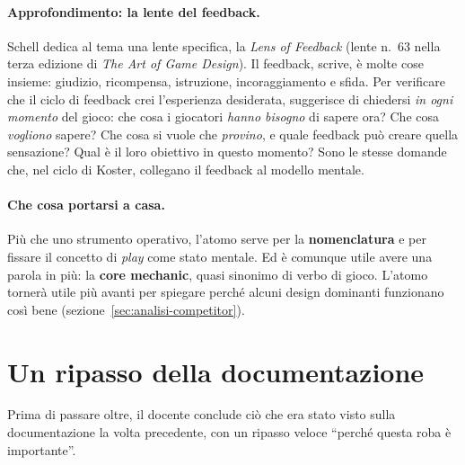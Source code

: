 \paragraph{Approfondimento: la lente del feedback.} Schell dedica al tema
una lente specifica, la \emph{Lens of Feedback} (lente n.~63 nella terza
edizione di \emph{The Art of Game Design}). Il feedback, scrive, è molte cose
insieme: giudizio, ricompensa, istruzione, incoraggiamento e sfida. Per
verificare che il ciclo di feedback crei l'esperienza desiderata, suggerisce
di chiedersi \emph{in ogni momento} del gioco: che cosa i giocatori
\emph{hanno bisogno} di sapere ora? Che cosa \emph{vogliono} sapere? Che cosa
si vuole che \emph{provino}, e quale feedback può creare quella sensazione?
Qual è il loro obiettivo in questo momento? Sono le stesse domande che, nel
ciclo di Koster, collegano il feedback al modello mentale.

\paragraph{Che cosa portarsi a casa.} Più che uno strumento operativo, l'atomo
serve per la \textbf{nomenclatura} e per fissare il concetto di \emph{play}
come stato mentale. Ed è comunque utile avere una parola in più: la
\textbf{core mechanic}, quasi sinonimo di verbo di gioco. L'atomo tornerà
utile più avanti per spiegare perché alcuni design dominanti funzionano così
bene (sezione~\ref{sec:analisi-competitor}).

\section{Un ripasso della documentazione}
\label{sec:recap-documentazione}

Prima di passare oltre, il docente conclude ciò che era stato visto sulla
documentazione la volta precedente, con un ripasso veloce ``perché questa
roba è importante''.

